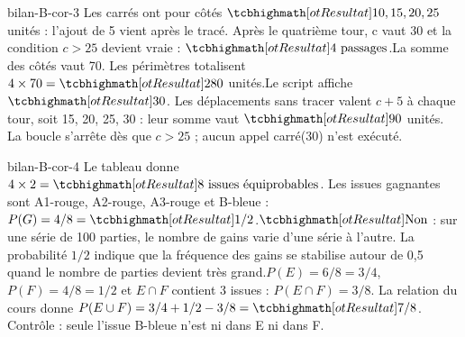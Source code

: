 \begin{blocEdition}{bilan-B-cor-3}
Les carrés ont pour côtés $\res{10,15,20,25}$ unités : l’ajout de 5 vient après le tracé. Après le quatrième tour, c vaut 30 et la condition $c>25$ devient vraie : $\res{4\text{ passages}}$.La somme des côtés vaut 70. Les périmètres totalisent $4\times70=\res{280}$ unités.Le script affiche $\res{30}$. Les déplacements sans tracer valent $c+5$ à chaque tour, soit 15, 20, 25, 30 : leur somme vaut $\res{90}$ unités. La boucle s’arrête dès que $c>25$ ; aucun appel carré(30) n’est exécuté.\label{fig-bilan-B-cor-3}

\end{blocEdition}
\begin{blocEdition}{bilan-B-cor-4}
Le tableau donne $4\times2=\res{8\text{ issues équiprobables}}$. Les issues gagnantes sont A1-rouge, A2-rouge, A3-rouge et B-bleue : $P(G)=4/8=\res{1/2}$.$\res{\text{Non}}$ : sur une série de 100 parties, le nombre de gains varie d’une série à l’autre. La probabilité $1/2$ indique que la fréquence des gains se stabilise autour de 0,5 quand le nombre de parties devient très grand.$P(E)=6/8=3/4$, $P(F)=4/8=1/2$ et $E\cap F$ contient 3 issues : $P(E\cap F)=3/8$. La relation du cours donne $P(E\cup F)=3/4+1/2-3/8=\res{7/8}$. Contrôle : seule l’issue B-bleue n’est ni dans E ni dans F.\label{fig-bilan-B-cor-4}

\end{blocEdition}

